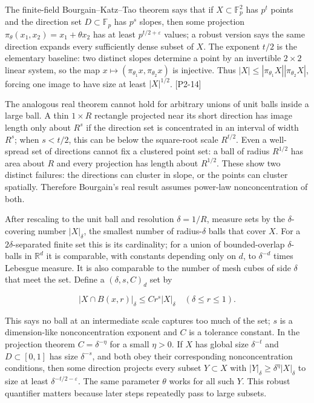 The finite-field Bourgain--Katz--Tao theorem says that if \(X\subset\mathbb F_p^2\) has \(p^t\) points and the direction set \(D\subset\mathbb F_p\) has \(p^s\) slopes, then some projection \(\pi_\theta(x_1,x_2)=x_1+\theta x_2\) has at least \(p^{t/2+\varepsilon}\) values; a robust version says the same direction expands every sufficiently dense subset of \(X\). The exponent \(t/2\) is the elementary baseline: two distinct slopes determine a point by an invertible \(2\times2\) linear system, so the map \(x\mapsto(\pi_{\theta_1}x,\pi_{\theta_2}x)\) is injective. Thus \(|X|\le |\pi_{\theta_1}X||\pi_{\theta_2}X|\), forcing one image to have size at least \(|X|^{1/2}\). {[}P2-14{]}

The analogous real theorem cannot hold for arbitrary unions of unit balls inside a large ball. A thin \(1\times R\) rectangle projected near its short direction has image length only about \(R^s\) if the direction set is concentrated in an interval of width \(R^s\); when \(s<t/2\), this can be below the square-root scale \(R^{t/2}\). Even a well-spread set of directions cannot fix a clustered point set: a ball of radius \(R^{1/2}\) has area about \(R\) and every projection has length about \(R^{1/2}\). These show two distinct failures: the directions can cluster in slope, or the points can cluster spatially. Therefore Bourgain's real result assumes power-law nonconcentration of both.

After rescaling to the unit ball and resolution \(\delta=1/R\), measure sets by the \(\delta\)-covering number \(|X|_\delta\), the smallest number of radius-\(\delta\) balls that cover \(X\). For a \(2\delta\)-separated finite set this is its cardinality; for a union of bounded-overlap \(\delta\)-balls in \(\mathbb R^d\) it is comparable, with constants depending only on \(d\), to \(\delta^{-d}\) times Lebesgue measure. It is also comparable to the number of mesh cubes of side \(\delta\) that meet the set. Define a \((\delta,s,C)_d\) set by

\[|X\cap B(x,r)|_\delta\le Cr^s|X|_\delta\quad(\delta\le r\le1).\]

This says no ball at an intermediate scale captures too much of the set; \(s\) is a dimension-like nonconcentration exponent and \(C\) is a tolerance constant. In the projection theorem \(C=\delta^{-\eta}\) for a small \(\eta>0\). If \(X\) has global size \(\delta^{-t}\) and \(D\subset[0,1]\) has size \(\delta^{-s}\), and both obey their corresponding nonconcentration conditions, then some direction projects every subset \(Y\subset X\) with \(|Y|_\delta\ge\delta^{\eta}|X|_\delta\) to size at least \(\delta^{-t/2-\varepsilon}\). The same parameter \(\theta\) works for all such \(Y\). This robust quantifier matters because later steps repeatedly pass to large subsets.

